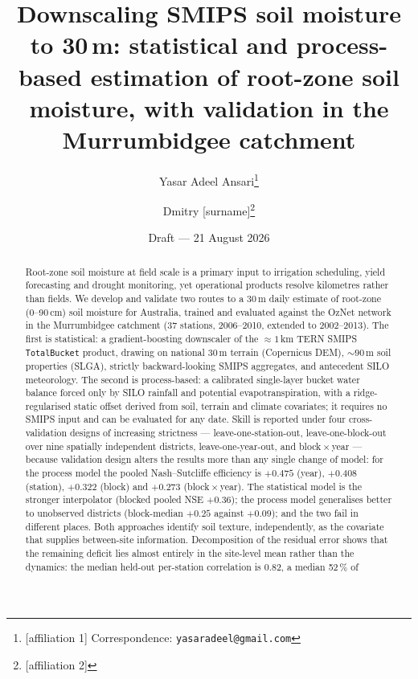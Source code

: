 \documentclass[11pt,a4paper]{article}
\title{Downscaling SMIPS soil moisture to 30\,m: statistical and
  process-based estimation of root-zone soil moisture, with validation in the
  Murrumbidgee catchment}
\author{Yasar Adeel Ansari\thanks{[affiliation 1] \quad
  Correspondence: \texttt{yasaradeel@gmail.com}}
  \and Dmitry [surname]\thanks{[affiliation 2]}}
\date{Draft --- 21 August 2026}
\begin{document}
\maketitle

\begin{center}
\begin{minipage}{0.9\textwidth}\small\itshape

\end{minipage}
\end{center}

\begin{abstract}
Root-zone soil moisture at field scale is a primary input to irrigation
scheduling, yield forecasting and drought monitoring, yet operational products
resolve kilometres rather than fields. We develop and validate two routes to a
30\,m daily estimate of root-zone (0--90\,cm) soil moisture for Australia,
trained and evaluated against the OzNet network in the Murrumbidgee catchment
(37 stations, 2006--2010, extended to 2002--2013). The first is statistical: a
gradient-boosting downscaler of the ${\approx}1$\,km TERN SMIPS
\texttt{TotalBucket} product, drawing on national 30\,m terrain (Copernicus
DEM), ${\sim}90$\,m soil properties (SLGA), strictly backward-looking SMIPS
aggregates, and antecedent SILO meteorology. The second is process-based: a
calibrated single-layer bucket water balance forced only by SILO rainfall and
potential evapotranspiration, with a ridge-regularised static offset derived
from soil, terrain and climate covariates; it requires no SMIPS input and can
be evaluated for any date. Skill is reported under four cross-validation
designs of increasing strictness --- leave-one-station-out,
leave-one-block-out over nine spatially independent districts,
leave-one-year-out, and block\,$\times$\,year --- because validation design
alters the results more than any single change of model: for the process model
the pooled Nash--Sutcliffe efficiency is $+0.475$ (year), $+0.408$ (station),
$+0.322$ (block) and $+0.273$ (block\,$\times$\,year). The statistical model
is the stronger interpolator (blocked pooled NSE $+0.36$); the process model
generalises better to unobserved districts (block-median $+0.25$ against
$+0.09$); and the two fail in different places. Both approaches identify soil
texture, independently, as the covariate that supplies between-site
information. Decomposition of the residual error shows that the remaining
deficit lies almost entirely in the site-level mean rather than the dynamics:
the median held-out per-station correlation is 0.82, a median 52\,\% of

\end{abstract}
\end{document}

